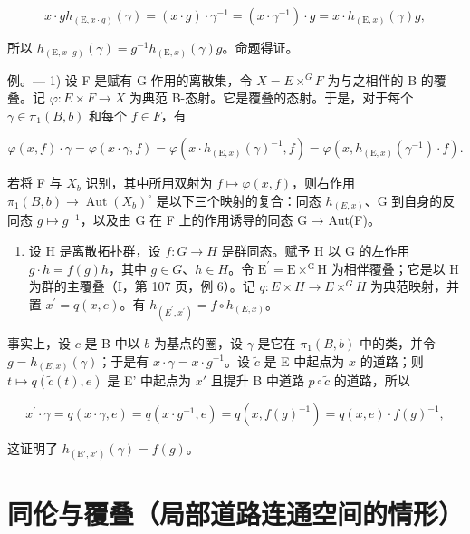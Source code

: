 \[
x \cdot g h _ {(\mathrm{E}, x \cdot g)} (\gamma) = (x \cdot g) \cdot \gamma^ {- 1} = (x \cdot \gamma^ {- 1}) \cdot g = x \cdot h _ {(\mathrm{E}, x)} (\gamma) g,
\]

所以 \(h_{(\mathrm{E},x\cdot g)}(\gamma)=g^{-1}h_{(\mathrm{E},x)}(\gamma)g\)。命题得证。

例。--- 1) 设 F 是赋有 G 作用的离散集，令 \(X = E \times^{G} F\) 为与之相伴的 B 的覆叠。记 \(\varphi: E \times F \to X\) 为典范 B-态射。它是覆叠的态射。于是，对于每个 \(\gamma \in \pi_{1}(B, b)\) 和每个 \(f \in F\)，有

\[
\varphi (x, f) \cdot \gamma = \varphi (x \cdot \gamma , f) = \varphi (x \cdot h _ {(\mathrm{E}, x)} (\gamma) ^ {- 1}, f) = \varphi (x, h _ {(\mathrm{E}, x)} (\gamma^ {- 1}) \cdot f).\tag{5}
\]

若将 F 与 \(X_{b}\) 识别，其中所用双射为 \(f \mapsto \varphi(x, f)\)，则右作用 \(\pi_{1}(B, b) \to \operatorname{Aut}(X_{b})^{\circ}\) 是以下三个映射的复合：同态 \(h_{(E,x)}\)、G 到自身的反同态 \(g \mapsto g^{-1}\)，以及由 G 在 F 上的作用诱导的同态 G → Aut(F)。

\begin{enumerate}
\def\labelenumi{\arabic{enumi})}
\setcounter{enumi}{1}
\tightlist
\item
  设 H 是离散拓扑群，设 \(f\colon G\to H\) 是群同态。赋予 H 以 G 的左作用 \(g\cdot h=f(g)h\)，其中 \(g\in G\)、\(h\in H\)。令 \(\mathrm{E}^{\prime}=\mathrm{E}\times^{\mathrm{G}}\mathrm{H}\) 为相伴覆叠；它是以 H 为群的主覆叠（I，第 107 页，例 6）。记 \(q\colon E\times H\to E\times^{G}H\) 为典范映射，并置 \(x^{\prime}=q(x,e)\)。有 \(h_{(E^{\prime},x^{\prime})}=f\circ h_{(E,x)}\)。
\end{enumerate}

事实上，设 \(c\) 是 B 中以 \(b\) 为基点的圈，设 \(\gamma\) 是它在 \(\pi_1(B,b)\) 中的类，并令 \(g = h_{(E,x)}(\gamma)\)；于是有 \(x \cdot \gamma = x \cdot g^{-1}\)。设 \(\widetilde{c}\) 是 E 中起点为 \(x\) 的道路；则 \(t \mapsto q(\widetilde{c}(t), e)\) 是 E' 中起点为 \(x'\) 且提升 B 中道路 \(p \circ \widetilde{c}\) 的道路，所以

\[
x ^ {\prime} \cdot \gamma = q (x \cdot \gamma , e) = q (x \cdot g ^ {- 1}, e) = q (x, f (g) ^ {- 1}) = q (x, e) \cdot f (g) ^ {- 1},
\]

这证明了 \(h_{(\mathrm{E}', x')}(\gamma) = f(g)\)。

\section{同伦与覆叠（局部道路连通空间的情形）}

